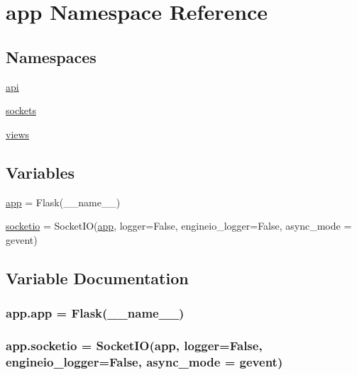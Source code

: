 \hypertarget{namespaceapp}{}\section{app Namespace Reference}
\label{namespaceapp}
\subsection*{Namespaces}
\begin{DoxyCompactItemize}
\item 
 \hyperlink{namespaceapp_1_1api}{api}
\item 
 \hyperlink{namespaceapp_1_1sockets}{sockets}
\item 
 \hyperlink{namespaceapp_1_1views}{views}
\end{DoxyCompactItemize}
\subsection*{Variables}
\begin{DoxyCompactItemize}
\item 
\hyperlink{namespaceapp_a675b4ea702c13dc4b8c05f985a25b496}{app} = Flask(\+\_\+\+\_\+name\+\_\+\+\_\+)
\item 
\hyperlink{namespaceapp_a5e96f78557153399b3460b769e9bfeac}{socketio} = Socket\+IO(\hyperlink{namespaceapp_a675b4ea702c13dc4b8c05f985a25b496}{app}, logger=False, engineio\+\_\+logger=False, async\+\_\+mode = \textquotesingle{}gevent\textquotesingle{})
\end{DoxyCompactItemize}


\subsection{Variable Documentation}
\subsubsection[{\texorpdfstring{app}{app}}]{\setlength{\rightskip}{0pt plus 5cm}app.\+app = Flask(\+\_\+\+\_\+name\+\_\+\+\_\+)}\hypertarget{namespaceapp_a675b4ea702c13dc4b8c05f985a25b496}{}\label{namespaceapp_a675b4ea702c13dc4b8c05f985a25b496}
\subsubsection[{\texorpdfstring{socketio}{socketio}}]{\setlength{\rightskip}{0pt plus 5cm}app.\+socketio = Socket\+IO({\bf app}, logger=False, engineio\+\_\+logger=False, async\+\_\+mode = \textquotesingle{}gevent\textquotesingle{})}\hypertarget{namespaceapp_a5e96f78557153399b3460b769e9bfeac}{}\label{namespaceapp_a5e96f78557153399b3460b769e9bfeac}
